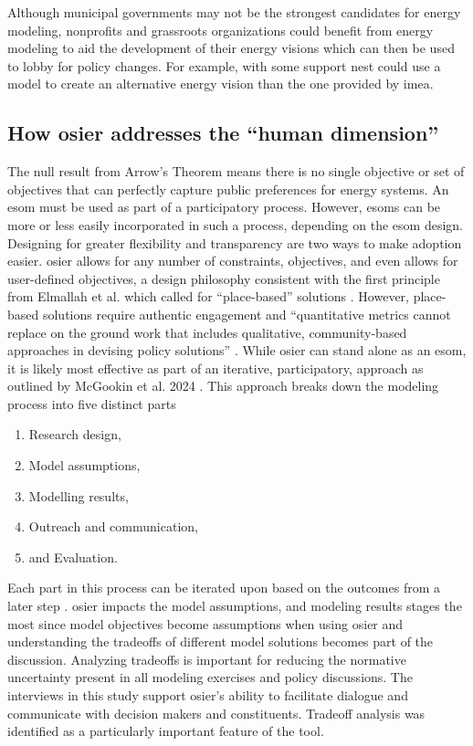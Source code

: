 Although municipal governments may not be the strongest candidates for energy
modeling, nonprofits and grassroots organizations could benefit from energy
modeling to aid the development of their energy visions which can then be used
to lobby for policy changes. For example, with some support \ac{nest} could use
a model to create an alternative energy vision than the one provided by
\ac{imea}.

\subsection{How \ac{osier} addresses the ``human dimension''} 

The null result from Arrow's Theorem means there is no single objective or set of objectives
that can perfectly capture public preferences for energy systems. An \ac{esom} must 
be used as part of a participatory process. However, \acp{esom} can 
be more or less easily incorporated in such a process, depending on the \ac{esom} design.
Designing for greater flexibility and transparency are two ways to make adoption easier.
\ac{osier} allows for any number of constraints, objectives, and even allows for
user-defined objectives, a design philosophy consistent with the first principle
from Elmallah et al. which called for ``place-based'' solutions
\cite{elmallah_frontlining_2022}. However, place-based solutions require
authentic engagement and ``quantitative metrics cannot replace on the ground
work that includes qualitative, community-based approaches in devising policy
solutions'' \cite{elmallah_frontlining_2022}. While \ac{osier} can stand alone
as an \ac{esom}, it is likely most effective as part of an iterative,
participatory, approach as outlined by McGookin et al. 2024
\cite{mcgookin_advancing_2024}. This approach breaks down the modeling process
into five distinct parts
\begin{enumerate}
    \item Research design,
    \item Model assumptions,
    \item Modelling results,
    \item Outreach and communication,
    \item and Evaluation.
\end{enumerate}
Each part in this process can be iterated upon based on the outcomes from a
later step \cite{mcgookin_advancing_2024}. \ac{osier} impacts the model
assumptions, and modeling results stages the most since model objectives become
assumptions when using \ac{osier} and understanding the tradeoffs of different
model solutions becomes part of the discussion. Analyzing tradeoffs is important
for reducing the normative uncertainty present in all modeling exercises and
policy discussions. The interviews in this study support \ac{osier}'s ability to
facilitate dialogue and communicate with decision makers and constituents.
Tradeoff analysis was identified as a particularly important feature of the
tool.

